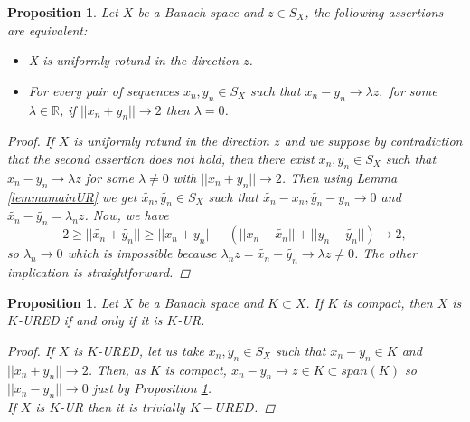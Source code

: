 \documentclass[11pt]{amsart}
\newcommand{\R}{\mathbb{R}}
\newcommand{\<}{\langle}
\renewcommand{\>}{\rangle}
\newtheorem{prop}[theorem]{Proposition}
\theoremstyle{definition}
\theoremstyle{remark}
\numberwithin{equation}{section}
\def\R{{\mathbb R}}
\begin{document}
\begin{prop}\label{equivURED}
Let $X$ be a Banach space and $z\in S_X$, the following assertions are equivalent:
\begin{itemize}
\item X is uniformly rotund in the direction $z$.
\item For every pair of sequences $x_n,y_n\in S_X$ such that $x_n-y_n\rightarrow \lambda z,$ for some $\lambda\in \R$, if $||x_n+y_n||\rightarrow 2$ then $\lambda=0$.
\end{itemize}
\begin{proof}
If $X$ is uniformly rotund in the direction $z$ and we suppose by contradiction that the second assertion does not hold, then there exist $x_n,y_n\in S_X$ such that $x_n-y_n\rightarrow \lambda z$ for some $\lambda\neq0$ with $||x_n+y_n||\rightarrow 2$. Then using Lemma \ref{lemmamainUR} we get $\widetilde{x_n},\widetilde{y_n}\in S_X$ such that $\widetilde{x_n}-x_n,\widetilde{y_n}-y_n\rightarrow 0$ and $\widetilde{x_n}-\widetilde{y_n}=\lambda_nz$. Now, we have
$$2\ge||\widetilde{x_n}+\widetilde{y_n}||\ge||x_n+y_n||-(||x_n-\widetilde{x_n}||+||y_n-\widetilde{y_n}||)\rightarrow 2,$$
so $\lambda_n\rightarrow0$ which is impossible because $\lambda_n z=\widetilde{x_n}-\widetilde{y_n}\rightarrow \lambda z\neq0$.
The other implication is straightforward.
\end{proof}
\end{prop}

\begin{prop}
Let $X$ be a Banach space and $K\subset X$. If $K$ is compact, then $X$ is $K$-URED if and only if it is $K$-UR.
\begin{proof}
If $X$ is $K$-URED, let us take $x_n,y_n\in S_X$ such that $x_n-y_n\in K$ and $||x_n+y_n||\rightarrow 2$. Then, as $K$ is compact, $x_n-y_n\rightarrow z\in K\subset span(K)$ so $||x_n-y_n||\rightarrow 0$ just by Proposition \ref{equivURED}.\\
If $X$ is $K$-UR then it is trivially $K-URED$.
\end{proof}
\end{prop}
\end{document}
